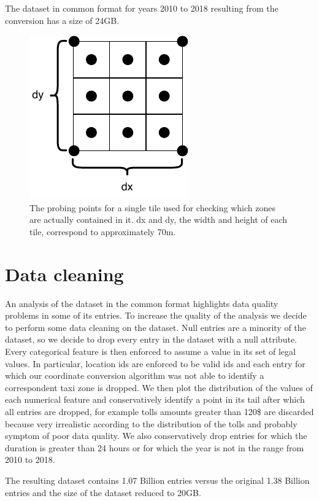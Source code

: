 \documentclass{acm_proc_article-sp-sigmod09}
\begin{document}
The dataset in common format for years 2010 to 2018 resulting from the conversion has a size of 24GB.

\begin{figure}
	\centering
	\includegraphics{resources/probing_points.pdf}
	\caption{The probing points for a single tile used for checking which zones are actually contained in it. dx and dy, the width and height of each tile, correspond to approximately 70m.}
	\label{fig:probingPoints}
\end{figure}

\section{Data cleaning}

An analysis of the dataset in the common format highlights data quality problems in some of its entries. To increase the quality of the analysis we decide to perform some data cleaning on the dataset.
Null entries are a minority of the dataset, so we decide to drop every entry in the dataset with a null attribute. Every categorical feature is then enforced to assume a value in its set of legal values. In particular, location ids are enforced to be valid ids and each entry for which our coordinate conversion algorithm was not able to identify a correspondent taxi zone is dropped. We then plot the distribution of the values of each numerical feature and conservatively identify a point in its tail after which all entries are dropped, for example tolls amounts greater than 120\$ are discarded because very irrealistic according to the distribution of the tolls and probably symptom of poor data quality. We also conservatively drop entries for which the duration is greater than 24 hours or for which the year is not in the range from 2010 to 2018.

The resulting dataset contains 1.07 Billion entries versus the original 1.38 Billion entries and the size of the dataset reduced to 20GB.
\end{document}
